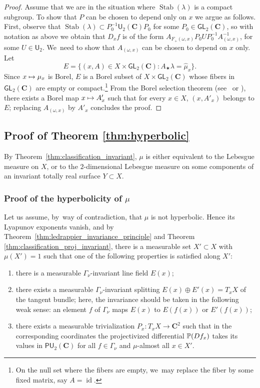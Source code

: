 \documentclass[11pt]{article}
\newenvironment{enumeratea}
{\bgroup\def\theenumi{\alph{enumi}}\begin{enumerate}}
{\end{enumerate}\egroup}
\newcommand\mto{\mathchoice{\longmapsto}{\mapsto}{\mapsto}{\mapsto}}
\let\sep :
\newcommand{\bset}[1]{\bigl\{#1\bigr\}}
\newcommand{\inv}{^{-1}}
\DeclareMathOperator{\id}{id}
\DeclareMathOperator{\Stab}{Stab}
\def\C{\mathbf{C}}
\newcommand\GL{{\mathsf{GL}}}
\theoremstyle{plain}
\theoremstyle{definition}
\numberwithin{equation}{section}
\begin{document}
\begin{proof}
Assume that we are in the situation where $\Stab(\lambda)$ is a compact subgroup.
To show that $P$ can be chosen to depend only on $x$ we argue as follows. First, observe that
$\Stab(\lambda) \subset P_0\inv \mathsf{U}_2(\C)P_0 $ for some $P_0\in \GL_2(\C)$, so with notation as above we obtain that $D_xf$ is of the form
$A_{F_+(\omega, x)} P_0 U P_0\inv A_{(\omega, x)}\inv$, for some $U\in \mathsf{U}_2$. We~need to show that $A_{(\omega, x)}$ can be chosen to depend on $x$ only.
Let
\begin{equation*}
E = \bset{(x, A)\in X\times \GL_2(\C)\sep  A_\varstar \lambda = \hat \mu_x}.
\end{equation*} Since
$x\mto \mu_x$ is Borel, $E$ is a Borel subset
of $X\times \GL_2(\C)$ whose fibers in $\GL_2(\C)$ are empty or compact.\footnote{On the null set where the fibers are empty, we~may replace the fiber by some fixed matrix, say $A=\id$.}
From the Borel selection theorem (see~\cite[Th.\,6.9.6]{bogachev_book} or \hbox{\cite[App.\,A]{Zimmer:book}}), there exists a Borel map $x\mto A'_x$ such that for every $x\in X$, $(x, A'_x)$ belongs to $E$; replacing
$A_{(\omega, x)}$ by $A'_x$ concludes the proof.
\end{proof}

\subsection{Proof of Theorem \ref{thm:hyperbolic}}\label{subs:proof_hyperbolic}
By Theorem~\ref{thm:classification_invariant},
$\mu$ is either equivalent to the Lebesgue measure on $X$, or to the $2$-dimensional Lebesgue measure on some components of an invariant totally real surface $Y\subset X$.

\subsubsection{Proof of the hyperbolicity of $\mu$}\label{subsubsec:721}
Let us assume, by~way of contradiction, that $\mu$ is not hyperbolic. Hence its Lyapunov exponents vanish,
and by Theorem~\ref{thm:ledrappier_invariance_principle} and Theorem \ref{thm:classification_proj_invariant}, there
is a measurable set $X'\subset X$
with $\mu(X') = 1$ such that one of the following properties is satisfied along $X'$: \label{alternative_abc}
\begin{enumeratea}
\item\label{case:a} there is a measurable $\Gamma_\nu$-invariant line field $E(x)$;
\item\label{case:b} there exists a measurable $\Gamma_\nu$-invariant splitting $E(x)\oplus E'(x)=T_xX$ of the tangent bundle;
here, the invariance should be taken in the following weak sense: an element $f$ of $\Gamma_\nu$ maps $E(x)$ to
$E(f(x))$ or $E'(f(x))$;
\item\label{case:c} there exists a measurable trivialization $P_x\colon T_xX\to \C^2$ such that in the corresponding coordinates
the projectivized
differential $\P(Df_x)$ takes its values in $\mathsf {PU}_2(\C)$ for all $f\in \Gamma_\nu$ and $\mu$-almost all $x\in X'$.
\end{enumeratea}
\end{document}
